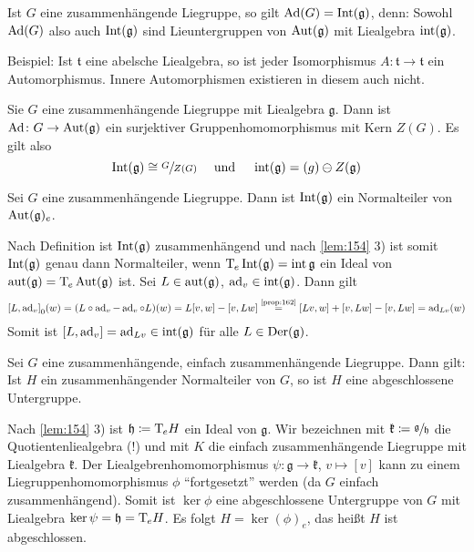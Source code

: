 Ist $G$ eine zusammenhängende Liegruppe, so gilt $\Ad(G) = \Int(\mathfrak{g})$, denn: Sowohl $\Ad(G)$ also auch $\Int(\mathfrak{g})$ sind Lieuntergruppen von $\Aut(\mathfrak{g})$ mit Liealgebra $\intAlg(\mathfrak{g})$.

Beispiel: Ist $\mathfrak{t}$ eine abelsche Liealgebra, so ist jeder Isomorphismus $A \colon \mathfrak{t} \to \mathfrak{t}$ ein Automorphismus.
Innere Automorphismen existieren in diesem auch nicht.

\begin{lemma}
	Sie $G$ eine zusammenhängende Liegruppe mit Liealgebra $\mathfrak{g}$.
	Dann ist $\Ad \colon G \to \Aut(\mathfrak{g})$ ein surjektiver Gruppenhomomorphismus mit Kern $Z(G)$.
	Es gilt also
	\[
		\Int(\mathfrak{g}) \cong \sfrac{G}{Z(G)} \quad \text{ und } \quad \intAlg(\mathfrak{g}) = \mathfrak(g) \ominus Z(\mathfrak{g})
	\]
\end{lemma}

\begin{lemma}
	Sei $G$ eine zusammenhängende Liegruppe.
	Dann ist $\Int(\mathfrak{g})$ ein Normalteiler von $\Aut(\mathfrak{g})_e$.
\end{lemma}
\begin{beweis}
	Nach Definition ist $\Int(\mathfrak{g})$ zusammenhängend und nach \autoref{lem:154} 3) ist somit $\Int(\mathfrak{g})$ genau dann Normalteiler, wenn $\Tmap_e \Int(\mathfrak{g}) = \intAlg{\mathfrak{g}}$ ein Ideal von $\aut(\mathfrak{g}) = \Tmap_e \Aut(\mathfrak{g})$ ist.
	Sei $L \in \aut(\mathfrak{g})$, $\ad_v \in \intAlg(\mathfrak{g})$.
	Dann gilt
	\begin{align}
		\benbrace*{L,\ad_v}_0 (w) = \enbrace*{L \circ \ad_v - \ad_v \circ L}(w) = L \benbrace*{v,w}- \benbrace*{v,Lw} \StackText{\ref{prop:162}}{=} \benbrace*{Lv, w} + \benbrace*{v,Lw} - \benbrace*{v,Lw} 
		= \ad_{Lv}(w)
	\end{align}
	Somit ist $\benbrace*{L, \ad_v} = \ad_{Lv} \in \intAlg(\mathfrak{g})$ für alle $L \in \Der(\mathfrak{g})$.
\end{beweis}

\begin{lemma}
	Sei $G$ eine zusammenhängende, einfach zusammenhängende Liegruppe.
	Dann gilt: Ist $H$ ein zusammenhängender Normalteiler von $G$, so ist $H$ eine abgeschlossene Untergruppe.
\end{lemma}
\begin{beweis}
	Nach \autoref{lem:154} 3) ist $\mathfrak{h} \coloneqq \Tmap_e H$ ein Ideal von $\mathfrak{g}$.
	Wir bezeichnen mit $\mathfrak{k} \coloneqq \sfrac{\mathfrak{g}}{\mathfrak{h}}$ die Quotientenliealgebra (!) und mit $K$ die einfach zusammenhängende Liegruppe mit Liealgebra $\mathfrak{k}$.
	Der Liealgebrenhomomorphismus $\psi \colon \mathfrak{g} \to \mathfrak{k}$, $v \mapsto [v]$ kann zu einem Liegruppenhomomorphismus $\phi$ \enquote{fortgesetzt} werden (da $G$ einfach zusammenhängend).
	Somit ist $\ker \phi$ eine abgeschlossene Untergruppe von $G$ mit Liealgebra $\ker \psi= \mathfrak{h}= \Tmap_e H$.
	Es folgt $H= \ker (\phi)_e$, das heißt $H$ ist abgeschlossen.
\end{beweis}

